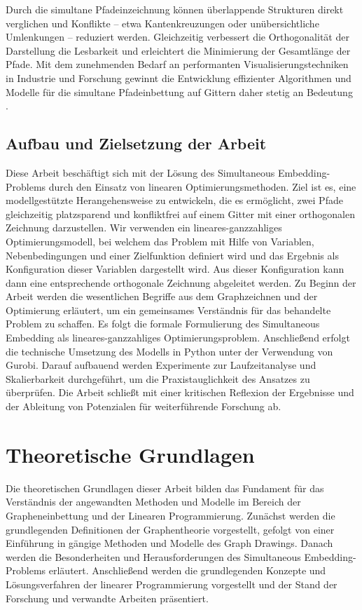\documentclass[bachelor, german]{algothesis}
\begin{document}
Durch die simultane Pfadeinzeichnung können überlappende Strukturen direkt verglichen und Konflikte – etwa Kantenkreuzungen oder unübersichtliche Umlenkungen – reduziert werden. Gleichzeitig verbessert die Orthogonalität der Darstellung die Lesbarkeit und erleichtert die Minimierung der Gesamtlänge der Pfade. Mit dem zunehmenden Bedarf an performanten Visualisierungstechniken in Industrie und Forschung gewinnt die Entwicklung effizienter Algorithmen und Modelle für die simultane Pfadeinbettung auf Gittern daher stetig an Bedeutung \cite{Handbook}.

\section{Aufbau und Zielsetzung der Arbeit}
Diese Arbeit beschäftigt sich mit der Lösung des Simultaneous Embedding-Problems durch den Einsatz von linearen Optimierungsmethoden. Ziel ist es, eine modellgestützte Herangehensweise zu entwickeln, die es ermöglicht, zwei Pfade gleichzeitig platzsparend und konfliktfrei auf einem Gitter mit einer orthogonalen Zeichnung darzustellen. Wir verwenden ein lineares-ganzzahliges Optimierungsmodell, bei welchem das Problem mit Hilfe von Variablen, Nebenbedingungen und einer Zielfunktion definiert wird und das Ergebnis als Konfiguration dieser Variablen dargestellt wird. Aus dieser Konfiguration kann dann eine entsprechende orthogonale Zeichnung abgeleitet werden. \newline
Zu Beginn der Arbeit werden die wesentlichen Begriffe aus dem Graphzeichnen und der Optimierung erläutert, um ein gemeinsames Verständnis für das behandelte Problem zu schaffen. Es folgt die formale Formulierung des Simultaneous Embedding als lineares-ganzzahliges Optimierungsproblem. Anschließend erfolgt die technische Umsetzung des Modells in Python unter der Verwendung von Gurobi. Darauf aufbauend werden Experimente zur Laufzeitanalyse und Skalierbarkeit durchgeführt, um die Praxistauglichkeit des Ansatzes zu überprüfen. Die Arbeit schließt mit einer kritischen Reflexion der Ergebnisse und der Ableitung von Potenzialen für weiterführende Forschung ab.


\chapter{Theoretische Grundlagen}
Die theoretischen Grundlagen dieser Arbeit bilden das Fundament für das Verständnis der angewandten Methoden und Modelle im Bereich der Grapheneinbettung und der Linearen Programmierung. Zunächst werden die grundlegenden Definitionen der Graphentheorie vorgestellt, gefolgt von einer Einführung in gängige Methoden und Modelle des Graph Drawings. Danach werden die Besonderheiten und Herausforderungen des Simultaneous Embedding-Problems erläutert. Anschließend werden die grundlegenden Konzepte und Lösungsverfahren der linearer Programmierung vorgestellt und der Stand der Forschung und verwandte Arbeiten präsentiert.
\end{document}

